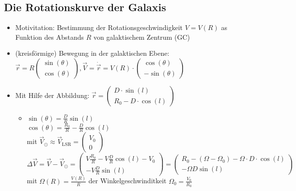 \subsection{Die Rotationskurve der Galaxis}
\begin{itemize}
	\item Motivitation: Bestimmung der Rotationsgeschwindigkeit $V=V(R)$ as Funktion des Abstands $R$ von galaktischem Zentrum (GC)
		\begin{figure}[H]
		\end{figure}
	\item (kreisförmige) Bewegung in der galaktischen Ebene: $\vec{r}=R\begin{pmatrix}\sin(\theta) \\ \cos(\theta)\end{pmatrix}, \vec{V}=\dot{\vec{r}}=V(R)\cdot\begin{pmatrix} \cos(\theta) \\ -\sin(\theta) \end{pmatrix}$
	\item Mit Hilfe der Abbildung: $\vec{r}=\begin{pmatrix} D\cdot\sin(l) \\ R_0-D\cdot\cos(l) \end{pmatrix}$
		\begin{itemize}
			\item $\sin(\theta)=\frac{D}{R}\sin(l)$\\
				$\cos(\theta)=\frac{R_0}{R}-\frac{D}{R}\cos(l)$\\
				mit $\vec{V}_\odot\approx \vec{V}_\text{LSR}=\begin{pmatrix} V_0 \\ 0 \end{pmatrix}$\\
					$\Delta\vec{V}=\vec{V}-\vec{V}_\odot=\begin{pmatrix} V\frac{R_0}{R}-V\frac{D}{R}\cos(l)-V_0 \\ -V\frac{D}{R}\sin(l)\end{pmatrix}= \begin{pmatrix} R_0-(\Omega-\Omega_0)-\Omega\cdot D\cdot\cos(l) \\ -\Omega D \sin(l) \end{pmatrix}$ mit $\Omega(R)=\frac{V(R)}{R}$ der Winkelgeschwinditkeit $\Omega_0=\frac{V_0}{R_0}$

\end{itemize}
\end{itemize}
